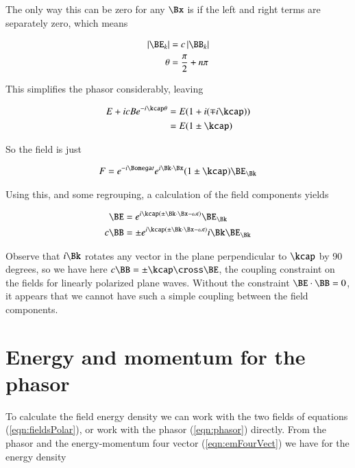 The only way this can be zero for any $\Bx$ is if the left and right terms are separately zero, which means

\begin{align*}
\Abs{\BE_k} &= c \Abs{\BB_k} \\
\theta &= \frac{\pi}{2} + n \pi
\end{align*}

This simplifies the phasor considerably, leaving

\begin{align*}
E + i c B e^{-i\kcap \theta}
&=
E(1 + i (\mp i\kcap )) \\
&=
E(1 \pm \kcap)
\end{align*}

So the field is just

\begin{align}
F = e^{-i \Bomega t} e^{i \Bk \cdot \Bx} (1 \pm \kcap) \BE_\Bk
\end{align}

Using this, and some regrouping, a calculation of the field components yields

\begin{align}
\BE &= e^{i \kcap( \pm \Bk \cdot \Bx -\omega t )} \BE_\Bk \\
c \BB &= \pm e^{i \kcap( \pm \Bk \cdot \Bx -\omega t )} i \Bk \BE_\Bk
\end{align}

Observe that $i\Bk$ rotates any vector in the plane perpendicular to $\kcap$ by 90 degrees, so we have here $c \BB = \pm \kcap \cross \BE$, the coupling constraint on the fields for linearly polarized plane waves.  Without the constraint $\BE \cdot \BB = 0$, it appears that we cannot have such a simple coupling between the field components.

\section{Energy and momentum for the phasor}

To calculate the field energy density we can work with the two fields of equations (\ref{eqn:fieldsPolar}), or work with the phasor (\ref{eqn:phasor}) directly.  From the phasor and the energy-momentum four vector (\ref{eqn:emFourVect}) we have for the energy density 

